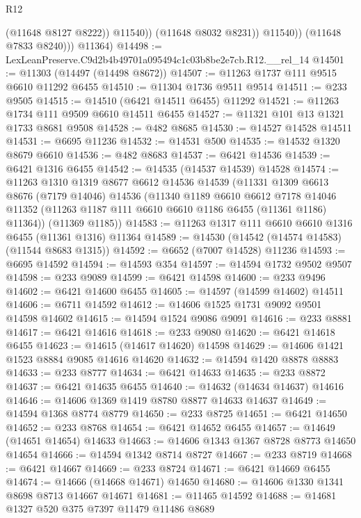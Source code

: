 \begin{lexlean}{R12}
\begin{coremodule}
                      (@11648 @8127 @8222))
                    @11540))
                (@11648 @8032 @8231))
              @11540))
          (@11648 @7833 @8240)))
      @11364)
@14498 := LexLeanPreserve.C9d2b4b49701a095494c1c03b8be2e7cb.R12.__rel_14
@14501 := @11303 (@14497 (@14498 @8672))
@14507 := @11263 @1737 @111 @9515 @6610 @11292 @6455
@14510 := @11304 @1736 @9511 @9514
@14511 := @233 @9505
@14515 := @14510 (@6421 @14511 @6455) @11292
@14521 := @11263 @1734 @111 @9509 @6610 @14511 @6455
@14527 := @11321 @101 @13 @1321 @1733 @8681 @9508
@14528 := @482 @8685
@14530 := @14527 @14528 @14511
@14531 := @6695 @11236
@14532 := @14531 @500
@14535 := @14532 @1320 @8679 @6610
@14536 := @482 @8683
@14537 := @6421 @14536
@14539 := @6421 @1316 @6455
@14542 := @14535 (@14537 @14539) @14528
@14574 := @11263
    @1310
    @1319
    @8677
    @6612
    @14536
    @14539
    (@11331
      @1309
      @6613
      @8676
      (@7179 @14046)
      @14536
      (@11340
        @1189
        @6610
        @6612
        @7178
        @14046
        @11352
        (@11263 @1187 @111 @6610 @6610 @1186 @6455 (@11361 @1186) @11364))
      (@11369 @1185))
@14583 := @11263 @1317 @111 @6610 @6610 @1316 @6455 (@11361 @1316) @11364
@14589 := @14530 (@14542 (@14574 @14583) (@11544 @8683 @1315))
@14592 := @6652 (@7007 @14528) @11236
@14593 := @6695 @14592
@14594 := @14593 @354
@14597 := @14594 @1732 @9502 @9507
@14598 := @233 @9089
@14599 := @6421 @14598
@14600 := @233 @9496
@14602 := @6421 @14600 @6455
@14605 := @14597 (@14599 @14602) @14511
@14606 := @6711 @14592
@14612 := @14606 @1525 @1731 @9092 @9501 @14598 @14602
@14615 := @14594 @1524 @9086 @9091
@14616 := @233 @8881
@14617 := @6421 @14616
@14618 := @233 @9080
@14620 := @6421 @14618 @6455
@14623 := @14615 (@14617 @14620) @14598
@14629 := @14606 @1421 @1523 @8884 @9085 @14616 @14620
@14632 := @14594 @1420 @8878 @8883
@14633 := @233 @8777
@14634 := @6421 @14633
@14635 := @233 @8872
@14637 := @6421 @14635 @6455
@14640 := @14632 (@14634 @14637) @14616
@14646 := @14606 @1369 @1419 @8780 @8877 @14633 @14637
@14649 := @14594 @1368 @8774 @8779
@14650 := @233 @8725
@14651 := @6421 @14650
@14652 := @233 @8768
@14654 := @6421 @14652 @6455
@14657 := @14649 (@14651 @14654) @14633
@14663 := @14606 @1343 @1367 @8728 @8773 @14650 @14654
@14666 := @14594 @1342 @8714 @8727
@14667 := @233 @8719
@14668 := @6421 @14667
@14669 := @233 @8724
@14671 := @6421 @14669 @6455
@14674 := @14666 (@14668 @14671) @14650
@14680 := @14606 @1330 @1341 @8698 @8713 @14667 @14671
@14681 := @11465 @14592
@14688 := @14681 @1327 @520 @375 @7397 @11479 @11486 @8689

\end{coremodule}
\end{lexlean}
